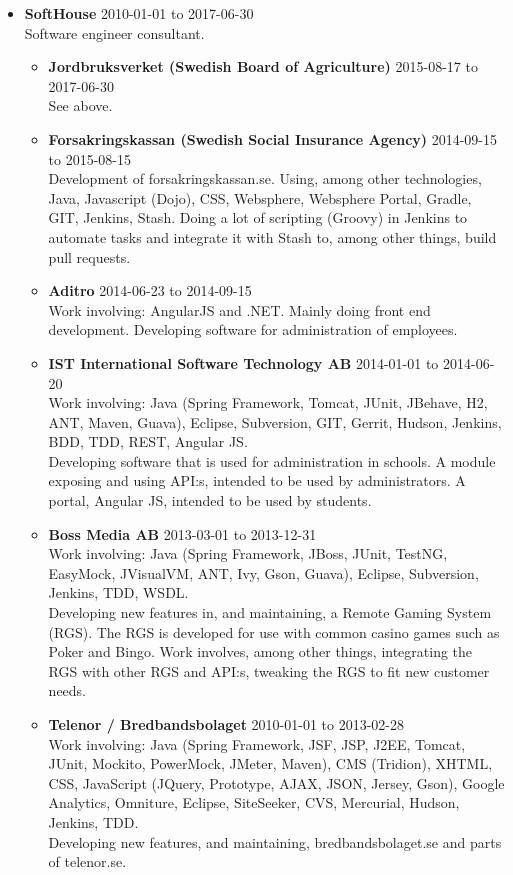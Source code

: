 \documentclass[a4paper]{article}
\begin{document}
\begin{itemize}
 \item \textbf{SoftHouse} 2010-01-01 to 2017-06-30 \\
 Software engineer consultant.
 \begin{itemize}
  \item \textbf{Jordbruksverket (Swedish Board of Agriculture)} 2015-08-17 to 2017-06-30 \\
  See above.
  
  \item \textbf{Forsakringskassan (Swedish Social Insurance Agency)} 2014-09-15 to 2015-08-15 \\
  Development of forsakringskassan.se. Using, among other technologies, Java, Javascript (Dojo), CSS, Websphere, Websphere Portal, Gradle, GIT, Jenkins, Stash. Doing a lot of scripting (Groovy) in Jenkins to automate tasks and integrate it with Stash to, among other things, build pull requests.
  
  \item \textbf{Aditro} 2014-06-23 to 2014-09-15 \\
  Work involving: AngularJS and .NET. Mainly doing front end development.
  Developing software for administration of employees.
  
  \item \textbf{IST International Software Technology AB} 2014-01-01 to 2014-06-20 \\
  Work involving: Java (Spring Framework, Tomcat, JUnit, JBehave, H2, ANT, Maven, Guava), Eclipse, Subversion, GIT, Gerrit, Hudson, Jenkins, BDD, TDD, REST, Angular JS. \\
  Developing software that is used for administration in schools. A module exposing and using API:s, intended to be used by administrators. A portal, Angular JS, intended to be used by students.
  
  \item \textbf{Boss Media AB} 2013-03-01 to 2013-12-31 \\
  Work involving: Java (Spring Framework, JBoss, JUnit, TestNG, EasyMock, JVisualVM, ANT, Ivy, Gson, Guava), Eclipse, Subversion, Jenkins, TDD, WSDL. \\
  Developing new features in, and maintaining, a Remote Gaming System (RGS). The RGS is developed for use with common casino games such as Poker and Bingo. Work involves, among other things, integrating the RGS with other RGS and API:s, tweaking the RGS to fit new customer needs.
  
  \item \textbf{Telenor / Bredbandsbolaget} 2010-01-01 to 2013-02-28 \\
  Work involving: Java (Spring Framework, JSF, JSP, J2EE, Tomcat, JUnit, Mockito, PowerMock, JMeter, Maven), CMS (Tridion), XHTML, CSS, JavaScript (JQuery, Prototype, AJAX, JSON, Jersey, Gson), Google Analytics, Omniture, Eclipse, SiteSeeker, CVS, Mercurial, Hudson, Jenkins, TDD. \\
  Developing new features, and maintaining, bredbandsbolaget.se and parts of telenor.se.


\end{itemize}
\end{itemize}
\end{document}
